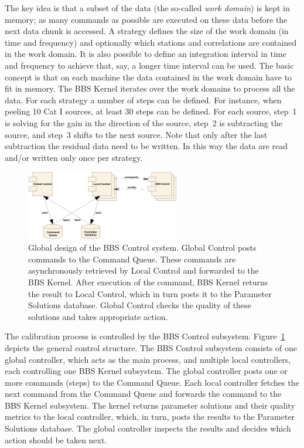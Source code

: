 \documentclass[10pt]{lofar}
\begin{document}
The key idea is that a subset of the data (the so-called \emph{work domain})
is kept in memory; as many commands as possible are executed on these data
before the next data chunk is accessed. A strategy defines the size of the
work domain (in time and frequency) and optionally which stations and
correlations are contained in the work domain. It is also possible to define
an integration interval in time and frequency to achieve that, say, a longer
time interval can be used. The basic concept is that on each machine the data
contained in the work domain have to fit in memory. The BBS Kernel iterates
over the work domains to process all the data.  For each strategy a number of
steps can be defined. For instance, when peeling 10 Cat I sources, at least 30
steps can be defined. For each source, step~1 is solving for the gain in the
direction of the source, step~2 is subtracting the source, and step~3 shifts
to the next source. Note that only after the last subtraction the residual
data need to be written.  In this way the data are read and/or written only
once per strategy.

\begin{figure}[!ht]
\centering
\includegraphics[width=0.6\textwidth]{images/bbs-control-global-design}
\caption{Global design of the BBS Control system. Global Control posts
commands to the Command Queue. These commands are asynchronously retrieved by
Local Control and forwarded to the BBS Kernel. After execution of the command,
BBS Kernel returns the result to Local Control, which in turn posts it to the
Parameter Solutions database. Global Control checks the quality of these
solutions and takes appropriate action.}
\label{fig:bbs-control-global-design}
\end{figure}

The calibration process is controlled by the BBS Control
subsystem. Figure~\ref{fig:bbs-control-global-design} depicts the general
control structure. The BBS Control subsystem consists of one global
controller, which acts as the main process, and multiple local controllers,
each controlling one BBS Kernel subsystem. The global controller posts one or
more commands (steps) to the Command Queue. Each local controller fetches the
next command from the Command Queue and forwards the command to the BBS Kernel
subsystem. The kernel returns parameter solutions and their quality metrics to
the local controller, which, in turn, posts the results to the Parameter
Solutions database. The global controller inspects the results and decides
which action should be taken next.
\end{document}
